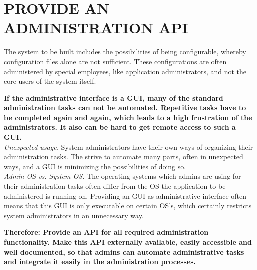 \newpage
\section*{PROVIDE AN ADMINISTRATION API}

The system to be built includes the possibilities of being configurable, whereby configuration files alone are not sufficient. These configurations are often administered by special employees, like application administrators, and not the core-users of the system itself.  

\begin{center}
  
\end{center}

\textbf{If the administrative interface is a GUI, many of the standard administration tasks can not be automated. Repetitive tasks have to be completed again and again, which leads to a high frustration of the administrators. It also can be hard to get remote access to such a GUI.}\\

\textit{Unexpected usage.} System administrators have their own ways of organizing their administration tasks. The strive to automate many parts, often in unexpected ways, and a GUI is minimizing the possibilities of doing so.\\

\textit{Admin OS vs. System OS.} The operating systems which admins are using for their administration tasks often differ from the OS the application to be administered is running on. Providing an GUI as administrative interface often means that this GUI is only executable on certain OS's, which certainly restricts system administrators in an unnecessary way.

\begin{center}
   
\end{center}

\textbf{Therefore: Provide an API for all required administration functionality. Make this API externally available, easily accessible and well documented, so that admins can automate administrative tasks and integrate it easily in the administration processes.}\\

